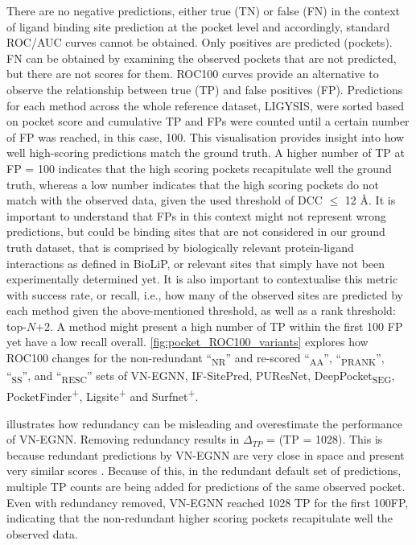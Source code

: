 There are no negative predictions, either true (TN) or false (FN) in the context of ligand binding site prediction at the pocket level and accordingly, standard ROC/AUC curves cannot be obtained. Only positives are predicted (pockets). FN can be obtained by examining the observed pockets that are not predicted, but there are not scores for them. ROC100 curves provide an alternative to observe the relationship between true (TP) and false positives (FP). Predictions for each method across the whole reference dataset, LIGYSIS, were sorted based on pocket score and cumulative TP and FPs were counted until a certain number of FP was reached, in this case, 100. This visualisation provides insight into how well high-scoring predictions match the ground truth. A higher number of TP at FP = 100 indicates that the high scoring pockets recapitulate well the ground truth, whereas a low number indicates that the high scoring pockets do not match with the observed data, given the used threshold of DCC $\leq$ 12 \AA{}. It is important to understand that FPs in this context might not represent wrong predictions, but could be binding sites that are not considered in our ground truth dataset, that is comprised by biologically relevant protein-ligand interactions as defined in BioLiP, or relevant sites that simply have not been experimentally determined yet. It is also important to contextualise this metric with success rate, or recall, i.e., how many of the observed sites are predicted by each method given the above-mentioned threshold, as well as a rank threshold: top-$N$+2. A method might present a high number of TP within the first 100 FP yet have a low recall overall. \autoref{fig:pocket_ROC100_variants} explores how ROC100 changes for the non-redundant ``\textsubscript{NR}'' and re-scored ``\textsubscript{AA}'', ``\textsubscript{PRANK}'', ``\textsubscript{SS}'', and ``\textsubscript{RESC}'' sets of VN-EGNN, IF-SitePred, PUResNet, DeepPocket\textsubscript{SEG}, PocketFinder\textsuperscript{+}, Ligsite\textsuperscript{+} and Surfnet\textsuperscript{+}.

 illustrates how redundancy can be misleading and overestimate the performance of VN-EGNN. Removing redundancy results in $\Delta_{TP}$ =  (TP = 1028). This is because redundant predictions by VN-EGNN are very close in space and present very similar scores . Because of this, in the redundant default set of predictions, multiple TP counts are being added for predictions of the same observed pocket. Even with redundancy removed, VN-EGNN reached 1028 TP for the first 100FP, indicating that the non-redundant higher scoring pockets recapitulate well the observed data.

